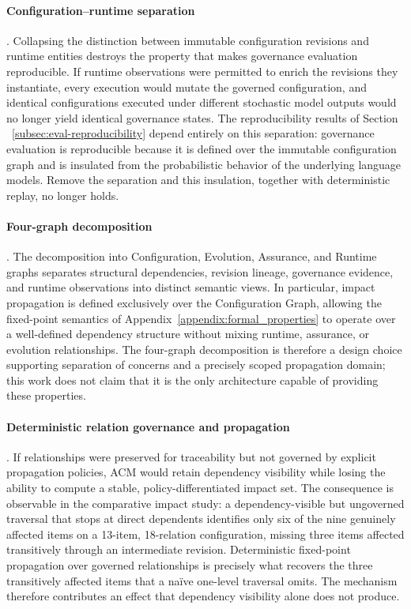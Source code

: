 \documentclass[10pt]{article}
\begin{document}
\paragraph{Configuration–runtime separation}. Collapsing the distinction between immutable configuration revisions and runtime entities destroys the property that makes governance evaluation reproducible. If runtime observations were permitted to enrich the revisions they instantiate, every execution would mutate the governed configuration, and identical configurations executed under different stochastic model outputs would no longer yield identical governance states. The reproducibility results of Section ~\ref{subsec:eval-reproducibility} depend entirely on this separation: governance evaluation is reproducible because it is defined over the immutable configuration graph and is insulated from the probabilistic behavior of the underlying language models. Remove the separation and this insulation, together with deterministic replay, no longer holds.

\paragraph{Four-graph decomposition}. The decomposition into Configuration, Evolution, Assurance, and Runtime graphs separates structural dependencies, revision lineage, governance evidence, and runtime observations into distinct semantic views. In particular, impact propagation is defined exclusively over the Configuration Graph, allowing the fixed-point semantics of Appendix~\ref{appendix:formal_properties} to operate over a well-defined dependency structure without mixing runtime, assurance, or evolution relationships. The four-graph decomposition is therefore a design choice supporting separation of concerns and a precisely scoped propagation domain; this work does not claim that it is the only architecture capable of providing these properties.

\paragraph{Deterministic relation governance and propagation}. If relationships were preserved for traceability but not governed by explicit propagation policies, ACM would retain dependency visibility while losing the ability to compute a stable, policy-differentiated impact set. The consequence is observable in the comparative impact study: a dependency-visible but ungoverned traversal that stops at direct dependents identifies only six of the nine genuinely affected items on a 13-item, 18-relation configuration, missing three items affected transitively through an intermediate revision. Deterministic fixed-point propagation over governed relationships is precisely what recovers the three transitively affected items that a naïve one-level traversal omits. The mechanism therefore contributes an effect that dependency visibility alone does not produce.
\end{document}
